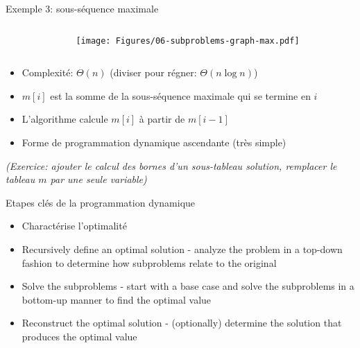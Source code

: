\begin{frame}{Exemple 3: sous-séquence maximale}

\bigskip


\begin{columns}
\begin{column}{7cm}
\begin{center}
{\footnotesize
{}
}
\end{center}
\end{column}
\begin{column}{3cm}
\centerline{\texttt{[image: Figures/06-subproblems-graph-max.pdf]}}
\end{column}
\end{columns}

\bigskip

\begin{itemize}
\item Complexité: $\Theta(n)$ (diviser pour régner: $\Theta(n\log n)$)
\item $m[i]$ est la somme de la sous-séquence maximale qui se termine en $i$
\item L'algorithme calcule $m[i]$ à partir de $m[i-1]$
\item Forme de programmation dynamique ascendante (très simple)
\end{itemize}

{\it\small (Exercice: ajouter le calcul des bornes d'un sous-tableau solution, remplacer le tableau $m$ par une seule variable)}

\end{frame}


\begin{frame}{Etapes clés de la programmation dynamique}

\begin{itemize}
\item Charactérise l'optimalité
\item Recursively define an optimal solution - analyze the problem in a top-down fashion to determine how subproblems relate to the original
\item Solve the subproblems - start with a base case and solve the subproblems in a bottom-up manner to find the optimal value
\item Reconstruct the optimal solution - (optionally) determine the solution that produces the optimal value
\end{itemize}

\end{frame}

